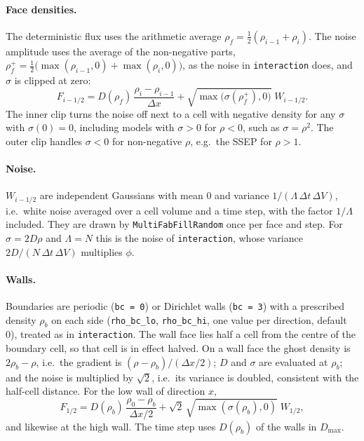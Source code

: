 \documentclass[11pt]{article}
\newcommand{\code}[1]{\texttt{#1}}
\begin{document}
\paragraph{Face densities.}
The deterministic flux uses the arithmetic average
$\rho_f = \tfrac12(\rho_{i-1}+\rho_i)$. The noise amplitude uses the average
of the non-negative parts,
$\rho_f^{+} = \tfrac12\big(\max(\rho_{i-1},0)+\max(\rho_i,0)\big)$, as the
noise in \code{interaction} does, and $\sigma$ is clipped at zero:
\begin{equation}\label{eq:flux}
  F_{i-1/2} = D(\rho_f)\,\frac{\rho_i-\rho_{i-1}}{\Delta x}
     + \sqrt{\max\!\big(\sigma(\rho_f^{+}),0\big)}\;W_{i-1/2}.
\end{equation}
The inner clip turns the noise off next to a cell with negative density for
any $\sigma$ with $\sigma(0)=0$, including models with $\sigma>0$ for
$\rho<0$, such as $\sigma=\rho^2$. The outer clip handles $\sigma<0$ for
non-negative $\rho$, e.g.\ the SSEP for $\rho>1$.

\paragraph{Noise.}
$W_{i-1/2}$ are independent Gaussians with mean $0$ and variance
$1/(\Lambda\,\Delta t\,\Delta V)$, i.e.\ white noise averaged over a cell
volume and a time step, with the factor $1/\Lambda$ included. They are drawn
by \code{MultiFabFillRandom} once per face and step. For $\sigma=2D\rho$ and
$\Lambda=N$ this is the noise of \code{interaction}, whose variance
$2D/(N\,\Delta t\,\Delta V)$ multiplies $\phi$.

\paragraph{Walls.}
Boundaries are periodic (\code{bc = 0}) or Dirichlet walls (\code{bc = 3})
with a prescribed density $\rho_b$ on each side (\code{rho\_bc\_lo},
\code{rho\_bc\_hi}, one value per direction, default 0), treated as in
\code{interaction}. The wall face lies half a cell from the centre of the
boundary cell, so that cell is in effect halved. On a wall face the ghost
density is $2\rho_b-\rho$, i.e.\ the gradient is $(\rho-\rho_b)/(\Delta x/2)$;
$D$ and $\sigma$ are evaluated at $\rho_b$; and the noise is multiplied by
$\sqrt2$, i.e.\ its variance is doubled, consistent with the half-cell
distance. For the low wall of direction $x$,
\begin{equation}
  F_{1/2} = D(\rho_b)\,\frac{\rho_0-\rho_b}{\Delta x/2}
          + \sqrt{2}\,\sqrt{\max(\sigma(\rho_b),0)}\;W_{1/2},
\end{equation}
and likewise at the high wall. The time step uses $D(\rho_b)$ of the walls in
$D_{\max}$.
\end{document}
